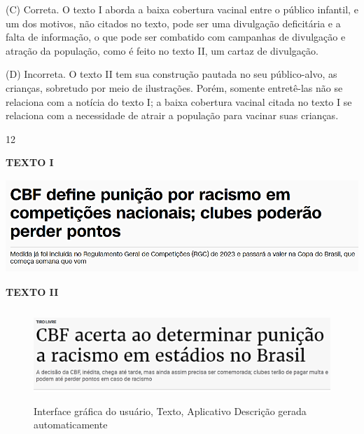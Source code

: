 (C) Correta. O texto I aborda a baixa cobertura vacinal entre o público
infantil, e um dos motivos, não citados no texto, pode ser uma
divulgação deficitária e a falta de informação, o que pode ser combatido
com campanhas de divulgação e atração da população, como é feito no
texto II, um cartaz de divulgação.

(D) Incorreta. O texto II tem sua construção pautada no seu
público-alvo, as crianças, sobretudo por meio de ilustrações. Porém,
somente entretê-las não se relaciona com a notícia do texto I; a baixa
cobertura vacinal citada no texto I se relaciona com a necessidade de
atrair a população para vacinar suas crianças.

\num{12}

\textbf{TEXTO I}

\includegraphics[width=5.34306in,height=1.37786in]{./imgSAEB_8_POR/media/image33.png}


\textbf{TEXTO II}

\begin{figure}
\centering
\includegraphics[width=5.47847in,height=1.37348in]{./imgSAEB_8_POR/media/image34.png}
\caption{Interface gráfica do usuário, Texto, Aplicativo Descrição
gerada automaticamente}
\end{figure}


